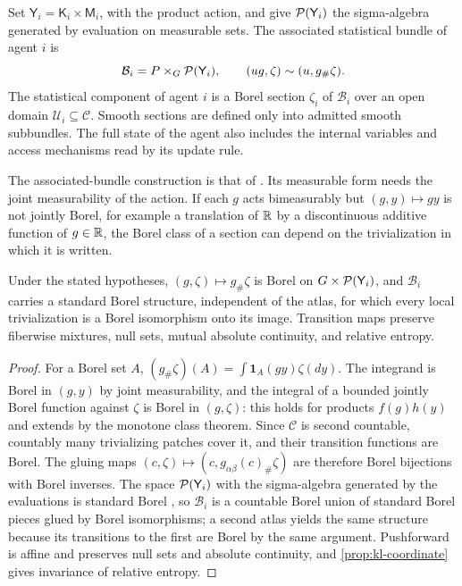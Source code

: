 Set $\mathsf Y_i=\mathsf K_i\times\mathsf M_i$, with the product action, and give $\mathcal P(\mathsf Y_i)$ the sigma-algebra generated by evaluation on measurable sets. The associated statistical bundle of agent $i$ is
\begin{equation}
\mathcal B_i=P\times_G\mathcal P(\mathsf Y_i),
\qquad (u g,\zeta)\sim(u,g_\#\zeta).
\label{eq:statistical-bundle}
\end{equation}
The statistical component of agent $i$ is a Borel section $\zeta_i$ of $\mathcal B_i$ over an open domain $\mathcal U_i\subseteq\mathcal C$. Smooth sections are defined only into admitted smooth subbundles. The full state of the agent also includes the internal variables and access mechanisms read by its update rule.

The associated-bundle construction is that of \citet[Section I.5]{KobayashiNomizu1963}. Its measurable form needs the joint measurability of the action. If each $g$ acts bimeasurably but $(g,y)\mapsto gy$ is not jointly Borel, for example a translation of $\mathbb R$ by a discontinuous additive function of $g\in\mathbb R$, the Borel class of a section can depend on the trivialization in which it is written.

Under the stated hypotheses, $(g,\zeta)\mapsto g_\#\zeta$ is Borel on $G\times\mathcal P(\mathsf Y_i)$, and $\mathcal B_i$ carries a standard Borel structure, independent of the atlas, for which every local trivialization is a Borel isomorphism onto its image. Transition maps preserve fiberwise mixtures, null sets, mutual absolute continuity, and relative entropy.
\begin{proof}
For a Borel set $A$, $(g_\#\zeta)(A)=\int\mathbf 1_A(gy)\zeta(dy)$. The integrand is Borel in $(g,y)$ by joint measurability, and the integral of a bounded jointly Borel function against $\zeta$ is Borel in $(g,\zeta)$: this holds for products $f(g)h(y)$ and extends by the monotone class theorem. Since $\mathcal C$ is second countable, countably many trivializing patches cover it, and their transition functions are Borel. The gluing maps $(c,\zeta)\mapsto(c,g_{\alpha\beta}(c)_\#\zeta)$ are therefore Borel bijections with Borel inverses. The space $\mathcal P(\mathsf Y_i)$ with the sigma-algebra generated by the evaluations is standard Borel \citep[Section~17.E]{Kechris1995}, so $\mathcal B_i$ is a countable Borel union of standard Borel pieces glued by Borel isomorphisms; a second atlas yields the same structure because its transitions to the first are Borel by the same argument. Pushforward is affine and preserves null sets and absolute continuity, and \cref{prop:kl-coordinate} gives invariance of relative entropy.
\end{proof}

